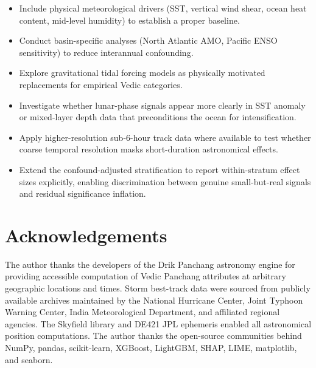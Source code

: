 \documentclass[12pt,a4paper]{article}
\begin{document}
    \begin{itemize}[noitemsep]
    \item Include physical meteorological drivers (SST, vertical wind shear,
            ocean heat content, mid-level humidity) to establish a proper baseline.
    \item Conduct basin-specific analyses (North Atlantic AMO, Pacific ENSO
            sensitivity) to reduce interannual confounding.
    \item Explore gravitational tidal forcing models as physically motivated
            replacements for empirical Vedic categories.
    \item Investigate whether lunar-phase signals appear more clearly in SST
            anomaly or mixed-layer depth data that preconditions the ocean for
            intensification.
    \item Apply higher-resolution sub-6-hour track data where available to
            test whether coarse temporal resolution masks short-duration
            astronomical effects.
    \item Extend the confound-adjusted stratification to report within-stratum
            effect sizes explicitly, enabling discrimination between genuine
            small-but-real signals and residual significance inflation.
    \end{itemize}

    \section*{Acknowledgements}

    The author thanks the developers of the Drik Panchang astronomy engine for
    providing accessible computation of Vedic Panchang attributes at arbitrary
    geographic locations and times. Storm best-track data were sourced from
    publicly available archives maintained by the National Hurricane Center,
    Joint Typhoon Warning Center, India Meteorological Department, and affiliated
    regional agencies. The Skyfield library and DE421 JPL ephemeris enabled all
    astronomical position computations. The author thanks the open-source
    communities behind NumPy, pandas, scikit-learn, XGBoost, LightGBM, SHAP,
    LIME, matplotlib, and seaborn.
\end{document}
